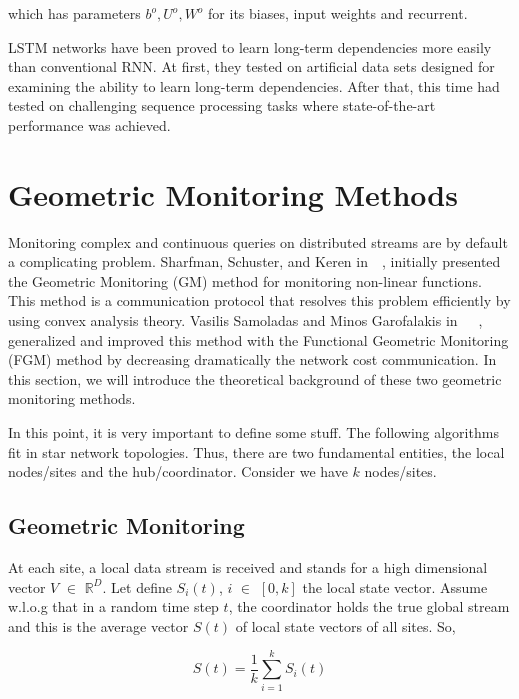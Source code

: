 which has parameters $b^o, U^o, W^o$ for its biases, input weights and recurrent.

LSTM networks have been proved to learn long-term dependencies more easily than conventional RNN\@.
At first, they tested on artificial data sets designed for examining the ability to learn long-term dependencies.
After that, this time had tested on challenging sequence processing tasks where state-of-the-art performance was achieved.


\section{Geometric Monitoring Methods}\label{sec:geometric-monitoring-methods}

Monitoring complex and continuous queries on distributed streams are by default a complicating problem.
Sharfman, Schuster, and Keren in~\cite{sharfman_geometric_2007}~\cite{sharfman_aggregate_2007}, initially presented the Geometric Monitoring (GM) method for monitoring non-linear functions.
This method is a communication protocol that resolves this problem efficiently by using convex analysis theory.
Vasilis Samoladas and Minos Garofalakis in~\cite{garofalakis_sketch-based_2013}~\cite{garofalakis_distributed_nodate}~\cite{samoladas_functional_nodate}, generalized and improved this method with the Functional Geometric Monitoring (FGM) method by decreasing dramatically the network cost communication.
In this section, we will introduce the theoretical background of these two geometric monitoring methods.

In this point, it is very important to define some stuff.
The following algorithms fit in star network topologies.
Thus, there are two fundamental entities, the local nodes/sites and the hub/coordinator.
Consider we have $k$ nodes/sites.

\subsection{Geometric Monitoring}\label{subsec:geometric-monitoring}

    At each site, a local data stream is received and stands for a high dimensional vector $V$ $\in$ $\mathbb{R}^D$.
Let define $S_i(t)$, $i$ $\in$ $[0,k]$ the local state vector.
Assume w.l.o.g that in a random time step $t$, the coordinator holds the true global stream and
this is the average vector $S(t)$ of local state vectors of all sites.
So,

\begin{equation}
    S(t) = \frac{1}{k} \sum_{i=1}^{k} S_i(t)\label{eq:equation}
\end{equation}

